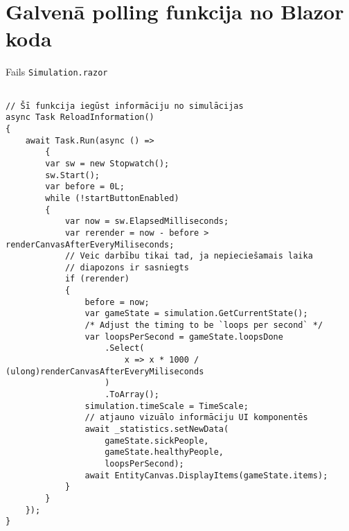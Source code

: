 \section{Galvenā polling funkcija no Blazor koda}
\label{app:polling}
Fails \texttt{Simulation.razor}
{
\begin{verbatim}

// Šī funkcija iegūst informāciju no simulācijas
async Task ReloadInformation()
{
    await Task.Run(async () =>
        {
        var sw = new Stopwatch();
        sw.Start();
        var before = 0L;
        while (!startButtonEnabled)
        {
            var now = sw.ElapsedMilliseconds;
            var rerender = now - before > renderCanvasAfterEveryMiliseconds;
            // Veic darbību tikai tad, ja nepieciešamais laika
            // diapozons ir sasniegts
            if (rerender)
            {
                before = now;
                var gameState = simulation.GetCurrentState();
                /* Adjust the timing to be `loops per second` */
                var loopsPerSecond = gameState.loopsDone
                    .Select(
                        x => x * 1000 / (ulong)renderCanvasAfterEveryMiliseconds
                    )
                    .ToArray();
                simulation.timeScale = TimeScale;
                // atjauno vizuālo informāciju UI komponentēs
                await _statistics.setNewData(
                    gameState.sickPeople,
                    gameState.healthyPeople,
                    loopsPerSecond);
                await EntityCanvas.DisplayItems(gameState.items);
            }
        }
    });
}
\end{verbatim}
}

